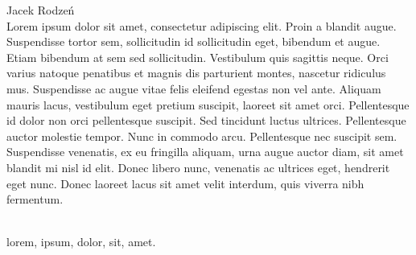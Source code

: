 \begin{newrevplenv}{Jacek Rodzeń}
{}\\
{Lorem ipsum dolor sit amet, consectetur adipiscing elit. Proin a blandit augue. Suspendisse tortor sem, sollicitudin id sollicitudin eget, bibendum et augue. Etiam bibendum at sem sed sollicitudin. Vestibulum quis sagittis neque. Orci varius natoque penatibus et magnis dis parturient montes, nascetur ridiculus mus. Suspendisse ac augue vitae felis eleifend egestas non vel ante. Aliquam mauris lacus, vestibulum eget pretium suscipit, laoreet sit amet orci. Pellentesque id dolor non orci pellentesque suscipit. Sed tincidunt luctus ultrices. Pellentesque auctor molestie tempor. Nunc in commodo arcu. Pellentesque nec suscipit sem. Suspendisse venenatis, ex eu fringilla aliquam, urna augue auctor diam, sit amet blandit mi nisl id elit. Donec libero nunc, venenatis ac ultrices eget, hendrerit eget nunc. Donec laoreet lacus sit amet velit interdum, quis viverra nibh fermentum.}\par%
\vspace{2mm}%
{}\\%
{lorem, ipsum, dolor, sit, amet.}%


\end{newrevplenv}
\label{rodzen_ende}